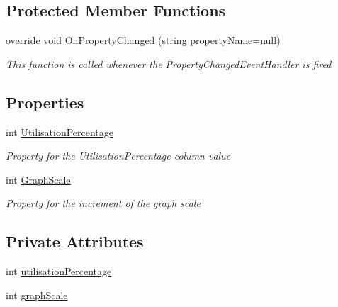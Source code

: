 \subsection*{Protected Member Functions}
\begin{DoxyCompactItemize}
\item 
override void \hyperlink{class_c_p_u___o_s___simulator_1_1_controls_1_1_graphs_1_1_view_models_1_1_c_p_u_graph_model_a52080a7db1449fa25e2f8d268a7e8ae2}{On\+Property\+Changed} (string property\+Name=\hyperlink{_old_01_process_01_flags_8cs_afb8e110345c45e74478894341ab6b28e}{null})
\begin{DoxyCompactList}\small\item\em This function is called whenever the Property\+Changed\+Event\+Handler is fired \end{DoxyCompactList}\end{DoxyCompactItemize}
\subsection*{Properties}
\begin{DoxyCompactItemize}
\item 
int \hyperlink{class_c_p_u___o_s___simulator_1_1_controls_1_1_graphs_1_1_view_models_1_1_c_p_u_graph_model_ac751900c034f55f5666cbc2d8bc6428f}{Utilisation\+Percentage}
\begin{DoxyCompactList}\small\item\em Property for the Utilisation\+Percentage column value \end{DoxyCompactList}\item 
int \hyperlink{class_c_p_u___o_s___simulator_1_1_controls_1_1_graphs_1_1_view_models_1_1_c_p_u_graph_model_a61f6ea27afc3a556bf44e36a90848b86}{Graph\+Scale}
\begin{DoxyCompactList}\small\item\em Property for the increment of the graph scale \end{DoxyCompactList}\end{DoxyCompactItemize}
\subsection*{Private Attributes}
\begin{DoxyCompactItemize}
\item 
int \hyperlink{class_c_p_u___o_s___simulator_1_1_controls_1_1_graphs_1_1_view_models_1_1_c_p_u_graph_model_a039df9096165345624e528950e95d30c}{utilisation\+Percentage}
\item 
int \hyperlink{class_c_p_u___o_s___simulator_1_1_controls_1_1_graphs_1_1_view_models_1_1_c_p_u_graph_model_ae089caf50d0a5f9a02e1bb8d789a5c1d}{graph\+Scale}
\end{DoxyCompactItemize}

